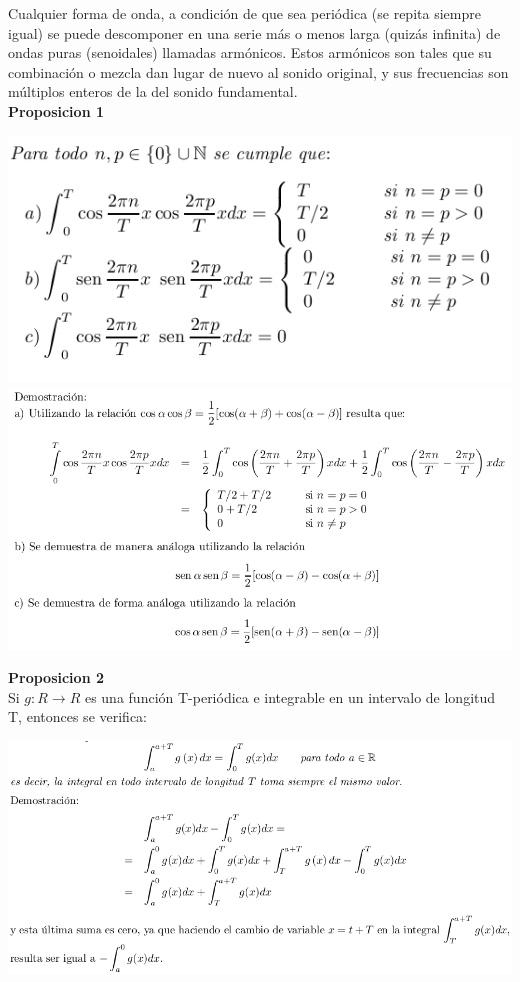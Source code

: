 \documentclass[10pt,a4paper]{book}
\begin{document}
Cualquier forma de onda, a condición de que sea periódica (se repita siempre igual) se puede descomponer en una serie más o menos larga (quizás infinita) de ondas puras (senoidales) llamadas armónicos. Estos armónicos son tales que su combinación o mezcla dan lugar de nuevo al sonido original, y sus frecuencias son múltiplos enteros de la del sonido fundamental.\\

\textbf{Proposicion 1}\\

\begin{center}
	\includegraphics[scale=0.45]{AudioFourier2.png}
	\includegraphics[scale=0.45]{AudioFourier3.png}
\end{center}

\textbf{Proposicion 2}\\
Si  $g  : R \rightarrow R$  es una función T-periódica e integrable en un intervalo de longitud T,    entonces se verifica:\\

\begin{center}
	\includegraphics[scale=0.45]{AudioFourier4.png}
\end{center}
\end{document}
